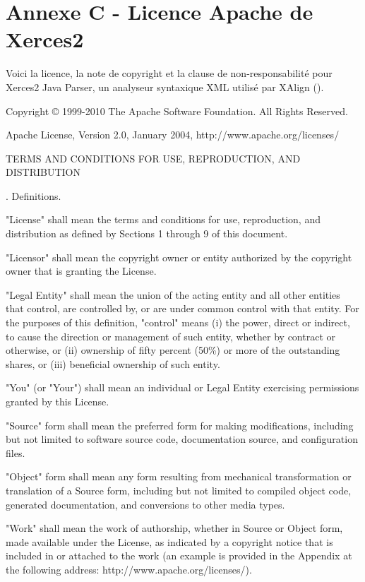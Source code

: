\chapter*{Annexe C - Licence Apache de Xerces2}
\noindent Voici la licence, la note de copyright et la clause de non-responsabilité pour Xerces2 Java Parser,
un analyseur syntaxique XML utilisé par XAlign (\cite{XAlign}).

\bigskip
\noindent Copyright © 1999-2010 The Apache Software Foundation. All Rights Reserved. 

\bigskip
\noindent Apache License, Version 2.0, January 2004, http://www.apache.org/licenses/

\bigskip
\noindent TERMS AND CONDITIONS FOR USE, REPRODUCTION, AND DISTRIBUTION

\bigskip
{}. Definitions.

\noindent "License" shall mean the terms and conditions for use, reproduction, and distribution as defined by Sections 1 through 9 of this document.

\noindent "Licensor" shall mean the copyright owner or entity authorized by the copyright owner that is granting the License.

\noindent "Legal Entity" shall mean the union of the acting entity and all other entities that control, are controlled by, or are under common control with that entity. For the purposes of this definition, "control" means (i) the power, direct or indirect, to cause the direction or management of such entity, whether by contract or otherwise, or (ii) ownership of fifty percent (50\%) or more of the outstanding shares, or (iii) beneficial ownership of such entity.

\noindent "You" (or "Your") shall mean an individual or Legal Entity exercising permissions granted by this License.

\noindent "Source" form shall mean the preferred form for making modifications, including but not limited to software source code, documentation source, and configuration files.

\noindent "Object" form shall mean any form resulting from mechanical transformation or translation of a Source form, including but not limited to compiled object code, generated documentation, and conversions to other media types.

\noindent "Work" shall mean the work of authorship, whether in Source or Object form, made available under the License, as indicated by a copyright notice that is included in or attached to the work (an example is provided in the Appendix at the following address: http://www.apache.org/licenses/).

